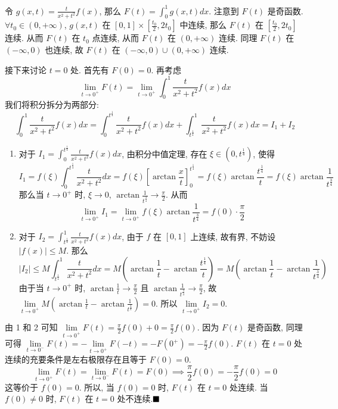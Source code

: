 \documentclass[lang=cn,newtx,10pt,scheme=chinese]{elegantbook}
\begin{document}
\begin{solution}
令 $g(x,t) = \frac{t}{x^2+t^2}f(x)$, 那么 $F(t) = \int_0^1 g(x,t) dx$. 注意到 $F(t)$ 是奇函数.
$\forall t_0 \in (0, +\infty)$, $g(x,t)$ 在 $[0,1] \times [\frac{t_0}{2}, 2t_0]$ 中连续, 那么 $F(t)$ 在 $[\frac{t_0}{2}, 2t_0]$ 连续.
从而 $F(t)$ 在 $t_0$ 点连续, 从而 $F(t)$ 在 $(0, +\infty)$ 连续. 同理 $F(t)$ 在 $(-\infty, 0)$ 也连续, 故 $F(t)$ 在 $(-\infty, 0) \cup (0, +\infty)$ 连续.

接下来讨论 $t=0$ 处. 首先有 $F(0)=0$. 再考虑
$$ \lim\limits_{t \to 0^+} F(t) = \boxed{\lim\limits_{t \to 0^+} \int_0^1 \frac{t}{x^2+t^2}f(x)dx }$$
我们将积分拆分为两部分:
$$ \int_0^1 \frac{t}{x^2+t^2}f(x)dx = \int_0^{t^{\frac{1}{4}}} \frac{t}{x^2+t^2}f(x)dx + \int_{t^{\frac{1}{4}}}^1 \frac{t}{x^2+t^2}f(x)dx = I_1 + I_2 $$
\begin{enumerate}
    \item 对于 $I_1 = \int_0^{t^{\frac{1}{4}}} \frac{t}{x^2+t^2}f(x)dx$, 由积分中值定理, 存在 $\xi \in (0, t^{\frac{1}{4}})$, 使得
    $$ I_1 = f(\xi) \int_0^{t^{\frac{1}{4}}} \frac{t}{x^2+t^2}dx = f(\xi)\left[\arctan \frac{x}{t}\right]_0^{t^{\frac{1}{4}}} = f(\xi) \arctan\frac{t^{\frac{1}{4}}}{t} = f(\xi) \arctan\frac{1}{t^{\frac{3}{4}}} $$
    那么当 $t \to 0^+$ 时, $\xi \to 0$, $\arctan\frac{1}{t^{\frac{3}{4}}} \to \frac{\pi}{2}$.
    从而
    $$ \lim\limits_{t \to 0^+} I_1 = \lim\limits_{t \to 0^+} f(\xi) \arctan\frac{1}{t^{\frac{3}{4}}} = f(0) \cdot \frac{\pi}{2} $$
    \item 对于 $I_2 = \int_{t^{\frac{1}{4}}}^1 \frac{t}{x^2+t^2}f(x)dx$, 由于 $f$ 在 $[0,1]$ 上连续, 故有界, 不妨设 $|f(x)| \le M$. 那么
    $$ |I_2| \le M \int_{t^{\frac{1}{4}}}^1 \frac{t}{x^2+t^2}dx = M \left(\arctan \frac{1}{t} - \arctan \frac{t^{\frac{1}{4}}}{t}\right) = M\left(\arctan\frac{1}{t} - \arctan\frac{1}{t^{\frac{3}{4}}}\right) $$
    由于当 $t \to 0^+$ 时, $\arctan\frac{1}{t} \to \frac{\pi}{2}$ 且 $\arctan\frac{1}{t^{\frac{3}{4}}} \to \frac{\pi}{2}$, 故 $\lim\limits_{t \to 0^+} M\left(\arctan\frac{1}{t} - \arctan\frac{1}{t^{\frac{3}{4}}}\right) = 0$.
    所以 $\lim\limits_{t \to 0^+} I_2 = 0$.
\end{enumerate}
由 1 和 2 可知 $\lim\limits_{t \to 0^+} F(t) = \frac{\pi}{2}f(0) + 0 = \frac{\pi}{2}f(0)$.
因为 $F(t)$ 是奇函数, 同理可得 $\lim\limits_{t \to 0^-} F(t) = -\lim\limits_{t \to 0^+} F(-t) = -F(0^+) = -\frac{\pi}{2}f(0)$.
$F(t)$ 在 $t=0$ 处连续的充要条件是左右极限存在且等于 $F(0)=0$.
$$ \lim\limits_{t \to 0^+} F(t) = \lim\limits_{t \to 0^-} F(t) = F(0) \implies \frac{\pi}{2}f(0) = -\frac{\pi}{2}f(0) = 0 $$
这等价于 $f(0)=0$.
所以, 当 $f(0)=0$ 时, $F(t)$ 在 $t=0$ 处连续. 当 $f(0) \neq 0$ 时, $F(t)$ 在 $t=0$ 处不连续.$\hfill \blacksquare$
\end{solution}
\end{document}
